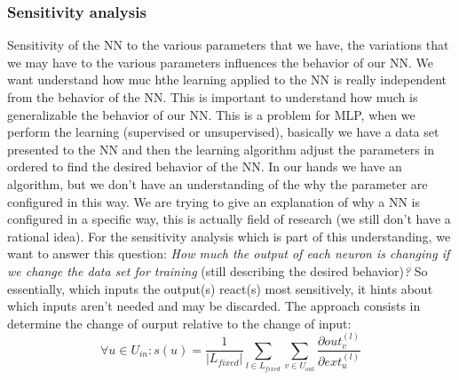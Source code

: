 \documentclass{article}
\begin{document}
\subsubsection{Sensitivity analysis}
Sensitivity of the NN to the various parameters that we have, the variations that we may have to the
various parameters influences the behavior of our NN. We want understand how muc hthe learning applied to the NN
is really independent from the behavior of the NN.
\newline\newline
This is important to understand how much is generalizable the behavior of our NN.
\newline\newline
This is a problem for MLP, when we perform the learning (supervised or unsupervised), basically we have a
data set presented to the NN and then the learning algorithm adjust the parameters in ordered to find the
desired behavior of the NN.
\newline\newline
In our hands we have an algorithm, but we don't have an understanding of the why the parameter
are configured in this way. We are trying to give an explanation of why a NN is configured in a specific way,
this is actually field of research (we still don't have a rational idea).
\newline\newline
For the sensitivity analysis which is part of this understanding, we want to answer this question: \textit{How much
    the output of each neuron is changing if we change the data set for training}
(still describing the desired behavior)\textit{?}
So essentially, which inputs the output(s) react(s) most sensitively, it hints about which inputs aren't needed
and may be discarded.
\newline\newline
The approach consists in determine the change of ourput relative to the change of input:
$$\forall u\in U_{in}:
    s(u)=\frac{1}{|L_{fixed}|} \sum_{l\in L_{fixed}} \sum_{v\in U_{out}} \frac{\partial out_v^{(l)}}{\partial ext_u^{(l)}}$$
\end{document}
